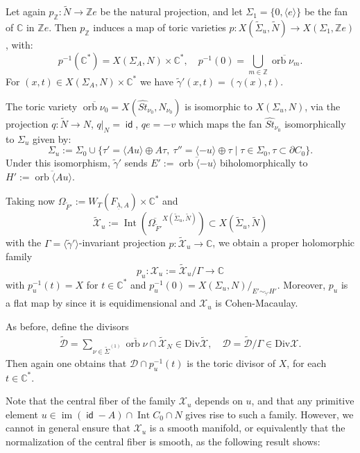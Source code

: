 \documentclass[JEP,XML,SOM,Unicode,NoFloatCountersInSection]{cedram}
\let\mathcal\mathscr
\theoremstyle{definition}
\let\wt\widetilde
\let\la\lambda
\let\del\partial
\let\ov\overline
\let\un\underline
\newcommand{\CC}{\mathbb{C}}
\newcommand{\ZZ}{\mathbb{Z}}
\DeclareMathOperator{\id}{\mathsf{id}}
\DeclareMathOperator{\im}{im}
\DeclareMathOperator{\Int}{Int}
\DeclareMathOperator{\orb}{orb}
\begin{document}
Let again $p_\ZZ:\wt{N}\to \ZZ e$ be the natural projection, and let $\Sigma_1=\{0,\langle e\rangle \}$ be the fan of $\CC$ in $\ZZ e$. Then $p_\ZZ$ induces a map of toric varieties $p:X(\wt{\Sigma}_u,\wt{N})\to X(\Sigma_1,\ZZ e)$, with:
\[
p^{-1}(\CC^*)=X(\Sigma_A,N)\times\CC^*,\quad
p^{-1}(0)=\bigcup_{m\in\ZZ}\overline{\orb\nu_m}.
\]
For $(x,t)\in X(\Sigma_A,N)\times\CC^*$ we have $\wt{\gamma}'(x,t)=(\gamma(x),t)$.

The toric variety $\ov{\orb \nu_0}=X(\widehat{St}_{\nu_0}, N_{\nu_0})$ is isomorphic to $X(\Sigma_u,N)$, via the projection $q:\wt{N}\to N$, $q|_N=\id$, $qe=-v$ which maps the fan $\widehat{St}_{\nu_0}$ isomorphically to $\Sigma_u$ given by:
\begin{equation*}
\Sigma_u:=\Sigma_0\cup\{\tau'=\langle Au\rangle\oplus A\tau, \ \tau''=\langle -u\rangle\oplus\tau\mid \tau\in\Sigma_0, \tau\subset\del C_0\}.
\end{equation*}
Under this isomorphism, $\wt{\gamma}'$ sends $E':=\ov{\orb \langle -u\rangle}$ biholomorphically to $H':=\ov{\orb\langle Au\rangle}$.

Taking now $\Omega_{\wt{F}'}:=W_T(F_{\un\la,A})\times\CC^*$ and
\begin{equation*}
\wt{\mathcal X}_u:=\Int(\ov{\Omega_{\wt{F}'}}{}^{X(\wt{\Sigma}_u,\wt{N})})\subset X(\wt{\Sigma}_u,\wt{N})
\end{equation*}
with the $\Gamma=\langle\wt{\gamma}'\rangle$-invariant projection $p:\wt{\mathcal X}_u\to \CC$, we obtain a proper holomorphic family
\begin{equation*}
p_{u}:\mathcal{X}_u:=\wt{\mathcal{X}}_u/\Gamma\to \CC
\end{equation*}
with $p_{u}^{-1}(t)=X$ for $t\in\CC^*$ and $p^{-1}_{u}(0)=X(\Sigma_u,N)/_{E'\sim_{\wt{\gamma}'} H'}$. Moreover, $p_u$ is a flat map by \cite[6.1.5]{ega} since it is equidimensional and $\mathcal{X}_u$ is Cohen-Macaulay.

As before, define the divisors
\begin{gather*}
\wt{\mathcal D}=\sum_{\nu\in\wt{\Sigma}^{(1)}}\ov{\orb\nu}\cap\wt{\mathcal X}_N\in\mathrm{Div}\wt{\mathcal X},\quad \mathcal D=\wt{\mathcal D}/\Gamma\in\mathrm{Div}{\mathcal X}.
\end{gather*}
Then again one obtains that $\mathcal D\cap p_u^{-1}(t)$ is the toric divisor of $X$, for each $t\in\CC^*$.

Note that the central fiber of the family $\mathcal{X}_u$ depends on $u$, and that any primitive element $u\in\im(\id-A)\cap \Int C_0\cap N$ gives rise to such a family. However, we cannot in general ensure that $\mathcal{X}_u$ is a smooth manifold, or equivalently that the normalization of the central fiber is smooth, as the following result shows:
\end{document}
